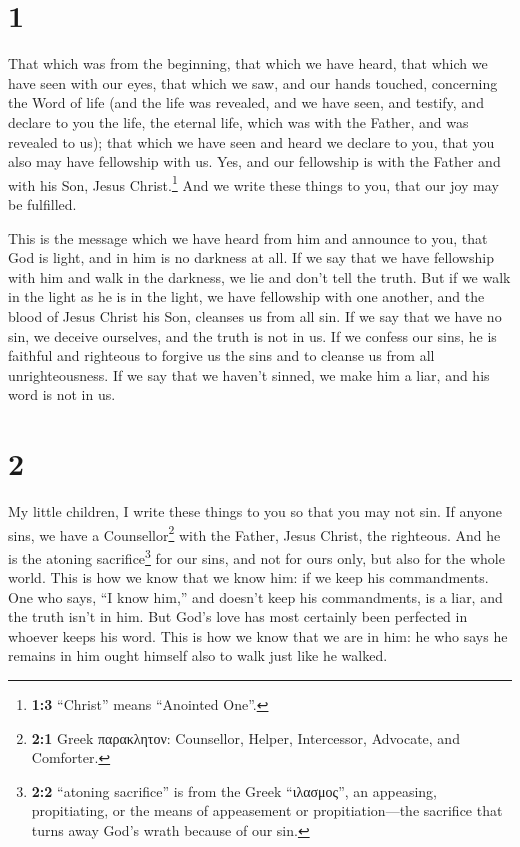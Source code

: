 \hypertarget{section}{%
\section{1}\label{section}}

 That which was from the beginning, that which we have
heard, that which we have seen with our eyes, that which we saw, and our
hands touched, concerning the Word of life  (and the life
was revealed, and we have seen, and testify, and declare to you the
life, the eternal life, which was with the Father, and was revealed to
us);  that which we have seen and heard we declare to you,
that you also may have fellowship with us. Yes, and our fellowship is
with the Father and with his Son, Jesus Christ.\footnote{\textbf{1:3}
  ``Christ'' means ``Anointed One''.}  And we write these
things to you, that our joy may be fulfilled.

 This is the message which we have heard from him and
announce to you, that God is light, and in him is no darkness at all.
 If we say that we have fellowship with him and walk in
the darkness, we lie and don't tell the truth.  But if we
walk in the light as he is in the light, we have fellowship with one
another, and the blood of Jesus Christ his Son, cleanses us from all
sin.  If we say that we have no sin, we deceive ourselves,
and the truth is not in us.  If we confess our sins, he is
faithful and righteous to forgive us the sins and to cleanse us from all
unrighteousness.  If we say that we haven't sinned, we
make him a liar, and his word is not in us.

\hypertarget{section-1}{%
\section{2}\label{section-1}}

 My little children, I write these things to you so that
you may not sin. If anyone sins, we have a Counsellor\footnote{\textbf{2:1}
  Greek παρακλητον: Counsellor, Helper, Intercessor, Advocate, and
  Comforter.} with the Father, Jesus Christ, the righteous.
 And he is the atoning sacrifice\footnote{\textbf{2:2}
  ``atoning sacrifice'' is from the Greek ``ιλασμος'', an appeasing,
  propitiating, or the means of appeasement or propitiation---the
  sacrifice that turns away God's wrath because of our sin.} for our
sins, and not for ours only, but also for the whole world.
 This is how we know that we know him: if we keep his
commandments.  One who says, ``I know him,'' and doesn't
keep his commandments, is a liar, and the truth isn't in him.
 But God's love has most certainly been perfected in
whoever keeps his word. This is how we know that we are in him:
 he who says he remains in him ought himself also to walk
just like he walked.

